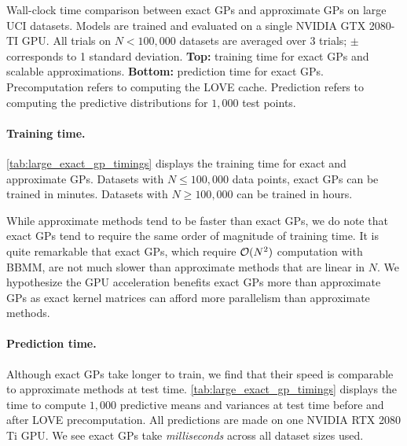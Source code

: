 \begin{table}[t!]
  \vspace{1em}
  \caption[Wall-clock time comparison between exact GPs and approximate GPs on large UCI datasets.]{
    Wall-clock time comparison between exact GPs and approximate GPs on large UCI datasets.
    Models are trained and evaluated on a single NVIDIA GTX 2080-TI GPU.
    All trials on $N < 100,\!000$ datasets are averaged over 3 trials; $\pm$ corresponds to 1 standard deviation.
    {\bf Top:} training time for exact GPs and scalable approximations.
    {\bf Bottom:} prediction time for exact GPs.
    Precomputation refers to computing the LOVE cache.
    Prediction refers to computing the predictive distributions for $1,\!000$ test points.
  }
  \label{tab:large_exact_gp_timings}
  \centering
  \vspace{1em}

  \resizebox{\textwidth}{!}{%
    
  }
  \vspace{1em}

  \resizebox{\textwidth}{!}{%
    
  }

  \vspace{2em}
\end{table}


\paragraph{Training time.}
\cref{tab:large_exact_gp_timings} displays the training time for exact and approximate GPs.
Datasets with $N \leq 100,\!000$ data points, exact GPs can be trained in minutes.
Datasets with $N \geq 100,\!000$ can be trained in hours.

While approximate methods tend to be faster than exact GPs, we do note that exact GPs tend to require the same order of magnitude of training time.
It is quite remarkable that exact GPs, which require $\bigo{N^2}$ computation with BBMM, are not much slower than approximate methods that are linear in $N$.
We hypothesize the GPU acceleration benefits exact GPs more than approximate GPs as exact kernel matrices can afford more parallelism than approximate methods.

\paragraph{Prediction time.}
Although exact GPs take longer to train, we find that their speed is comparable to approximate methods at test time.
\cref{tab:large_exact_gp_timings} displays the time to compute $1,\!000$ predictive means and variances at test time before and after LOVE precomputation.
All predictions are made on one NVIDIA RTX 2080 Ti GPU.
We see exact GPs take \emph{milliseconds} across all dataset sizes used.

